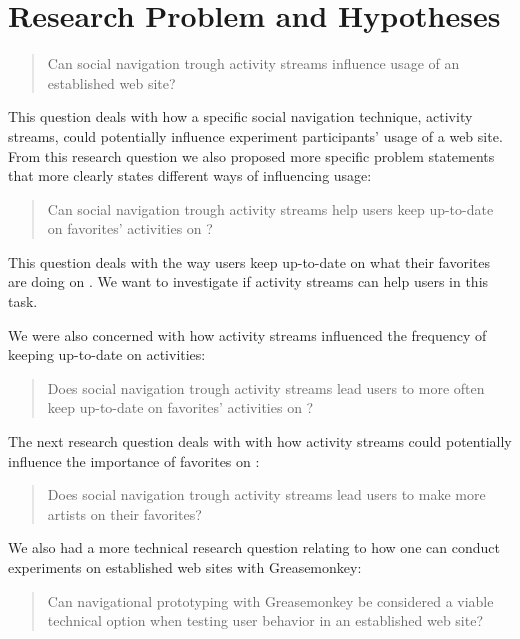 \section{Research Problem and Hypotheses}

\begin{quote}
  Can social navigation trough activity streams influence
  usage of an established web site?
\end{quote}

This question deals with how a specific social navigation technique, activity
streams, could potentially influence experiment participants' usage of a web
site.
From this research question we also proposed more specific problem statements
that more clearly states different ways of influencing usage:

\begin{quote}
  Can social navigation trough activity streams help users keep
  up-to-date on favorites' activities on \urort{}?
\end{quote}

This question deals with the way users keep up-to-date on what their favorites
are doing on \urort{}. We want to investigate if activity streams can help
users in this task.

We were also concerned with how activity streams influenced the
frequency of keeping up-to-date on activities:

\begin{quote}
  Does social navigation trough activity streams lead users to more often keep
  up-to-date on favorites' activities on \urort{}?
\end{quote}

The next research question deals with with how activity streams could
potentially influence the importance of favorites on \urort{}:

\begin{quote}
  Does social navigation trough activity streams lead users to make
  more artists on \urort{} their favorites?
\end{quote}

We also had a more technical research question relating to how one can
conduct experiments on established web sites with Greasemonkey:

\begin{quote}
  Can navigational prototyping with Greasemonkey be considered a
  viable technical option when testing user behavior in an
  established web site?
\end{quote}

